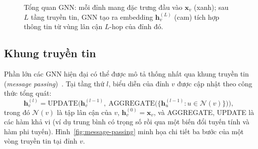 \begin{figure}[htbp]
\caption{Tổng quan GNN: mỗi đỉnh mang đặc trưng đầu vào $\mathbf{x}_v$ (xanh); sau $L$ tầng truyền tin, GNN tạo ra embedding $\mathbf{h}_v^{(L)}$ (cam) tích hợp thông tin từ vùng lân cận $L$-hop của đỉnh đó.}
\label{fig:gnn-overview}
\end{figure}

\subsection{Khung truyền tin}

Phần lớn các GNN hiện đại có thể được mô tả thống nhất qua khung truyền tin (\textit{message passing})~\cite{Gilmer2017MPNN}. Tại tầng thứ $l$, biểu diễn của đỉnh $v$ được cập nhật theo công thức tổng quát:
\begin{equation}
\mathbf{h}_v^{(l)} = \text{UPDATE}\Big(\mathbf{h}_v^{(l-1)},\ \text{AGGREGATE}\big(\{\mathbf{h}_u^{(l-1)} : u \in \mathcal{N}(v)\}\big)\Big),
\end{equation}
trong đó $\mathcal{N}(v)$ là tập lân cận của $v$, $\mathbf{h}_v^{(0)}=\mathbf{x}_v$, và AGGREGATE, UPDATE là các hàm khả vi (ví dụ trung bình có trọng số rồi qua một biến đổi tuyến tính và hàm phi tuyến). Hình~\ref{fig:message-passing} minh họa chi tiết ba bước của một vòng truyền tin tại đỉnh $v$.

